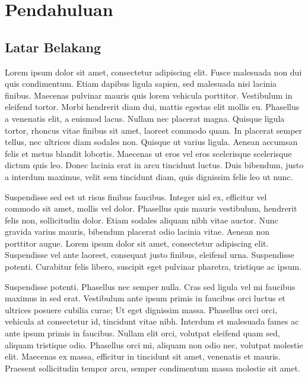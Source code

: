 \chapter{Pendahuluan}
\section{Latar Belakang}
    Lorem ipsum dolor sit amet, consectetur adipiscing elit. Fusce malesuada non dui quis condimentum. Etiam dapibus ligula sapien, sed malesuada nisi lacinia finibus. Maecenas pulvinar mauris quis lorem vehicula porttitor. Vestibulum in eleifend tortor. Morbi hendrerit diam dui, mattis egestas elit mollis eu. Phasellus a venenatis elit, a euismod lacus. Nullam nec placerat magna. Quisque ligula tortor, rhoncus vitae finibus sit amet, laoreet commodo quam. In placerat semper tellus, nec ultrices diam sodales non. Quisque ut varius ligula. Aenean accumsan felis et metus blandit lobortis. Maecenas ut eros vel eros scelerisque scelerisque dictum quis leo. Donec lacinia erat in arcu tincidunt luctus. Duis bibendum, justo a interdum maximus, velit sem tincidunt diam, quis dignissim felis leo ut nunc.\par

    Suspendisse sed est ut risus finibus faucibus. Integer nisl ex, efficitur vel commodo sit amet, mollis vel dolor. Phasellus quis mauris vestibulum, hendrerit felis non, sollicitudin dolor. Etiam sodales aliquam nibh vitae auctor. Nunc gravida varius mauris, bibendum placerat odio lacinia vitae. Aenean non porttitor augue. Lorem ipsum dolor sit amet, consectetur adipiscing elit. Suspendisse vel ante laoreet, consequat justo finibus, eleifend urna. Suspendisse potenti. Curabitur felis libero, suscipit eget pulvinar pharetra, tristique ac ipsum. \par

    Suspendisse potenti. Phasellus nec semper nulla. Cras sed ligula vel mi faucibus maximus in sed erat. Vestibulum ante ipsum primis in faucibus orci luctus et ultrices posuere cubilia curae; Ut eget dignissim massa. Phasellus orci orci, vehicula at consectetur id, tincidunt vitae nibh. Interdum et malesuada fames ac ante ipsum primis in faucibus. Nullam elit orci, volutpat eleifend quam sed, aliquam tristique odio. Phasellus orci mi, aliquam non odio nec, volutpat molestie elit. Maecenas ex massa, efficitur in tincidunt sit amet, venenatis et mauris. Praesent sollicitudin tempor arcu, semper condimentum massa molestie sit amet.\par

